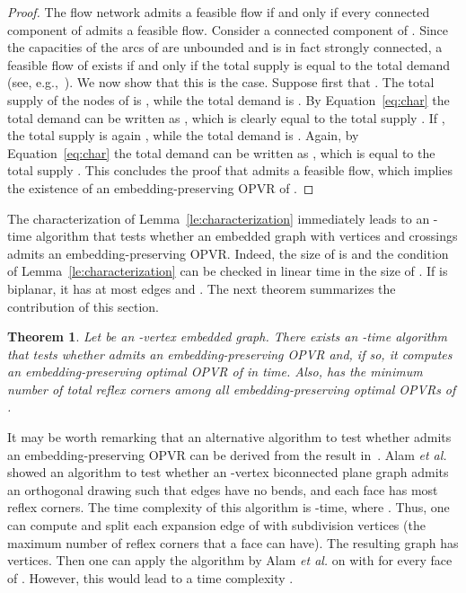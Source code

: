 \documentclass{article}
\newtheorem{theorem}{Theorem}
\newcommand{\opvr}{OPVR\xspace}
\begin{document}
\begin{proof}
The flow network  admits a feasible flow if and only if every connected component of  admits a feasible flow. Consider a connected component  of . Since the capacities of the arcs of  are unbounded and  is in fact strongly connected, a feasible flow of  exists if and only if the total supply is equal to the total demand (see, e.g.,~\cite{ht-fffscn-08}). We now show that this is the case. Suppose first that . The total supply of the nodes of  is , while the total demand is . By Equation~\ref{eq:char} the total demand can be written as , which is clearly equal to the total supply . If , the total supply is again , while the total demand is . Again, by Equation~\ref{eq:char} the total demand can be written as , which is equal to the total supply . This concludes the proof that  admits a feasible flow, which implies the existence of an embedding-preserving \opvr of .
\end{proof}


The characterization of Lemma~\ref{le:characterization} immediately leads to an -time algorithm that tests whether an embedded graph  with  vertices and  crossings admits an embedding-preserving \opvr. Indeed, the size of  is  and the condition of Lemma~\ref{le:characterization} can be checked in linear time in the size of . If  is biplanar, it has at most  edges and .
The next theorem summarizes the contribution of this section.


\begin{theorem}\label{th:test-opt}
Let  be an -vertex embedded graph. There exists an -time algorithm that tests whether  admits an embedding-preserving \opvr and, if so, it computes an embedding-preserving optimal \opvr  of  in  time.  Also,  has the minimum number of total reflex corners among all embedding-preserving optimal {\opvr}s of .
\end{theorem}

It may be worth remarking that an alternative algorithm to test whether  admits an embedding-preserving \opvr can be derived from the result in~\cite{DBLP:conf/sofsem/AlamKM16}. Alam {\em et al.}~\cite{DBLP:conf/sofsem/AlamKM16} showed an  algorithm to test whether an -vertex biconnected plane graph  admits an orthogonal drawing such that edges have no bends, and each face  has most  reflex corners. The time complexity of this algorithm is -time, where . Thus, one can compute  and split each expansion edge of  with  subdivision vertices (the maximum number of reflex corners that a face can have). The resulting graph  has  vertices. Then one can apply the algorithm by Alam {\em et al.} on  with  for every face  of .  However, this would lead to a time complexity  .
\end{document}

